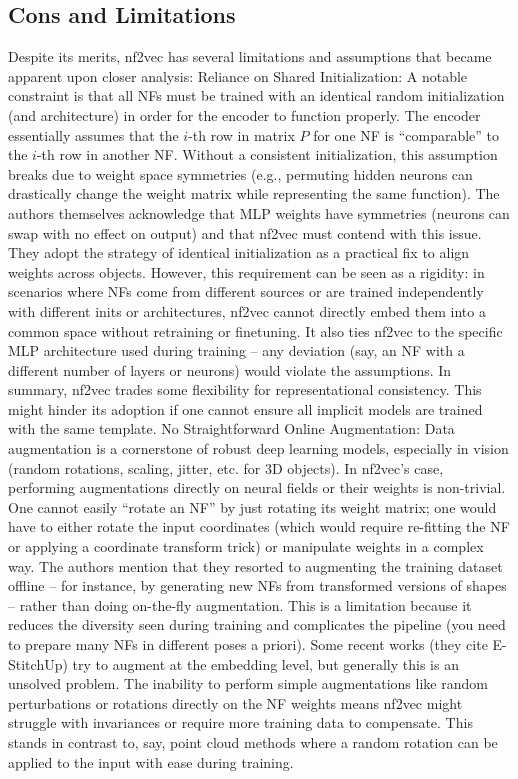 \documentclass[11pt]{article}
\begin{document}
\subsection*{Cons and Limitations}
Despite its merits, nf2vec has several limitations and assumptions that became apparent upon closer analysis:
Reliance on Shared Initialization: A notable constraint is that all NFs must be trained with an identical random initialization (and architecture) in order for the encoder to function properly. The encoder essentially assumes that the $i$-th row in matrix $P$ for one NF is “comparable” to the $i$-th row in another NF. Without a consistent initialization, this assumption breaks due to weight space symmetries (e.g., permuting hidden neurons can drastically change the weight matrix while representing the same function). The authors themselves acknowledge that MLP weights have symmetries (neurons can swap with no effect on output) and that nf2vec must contend with this issue. They adopt the strategy of identical initialization as a practical fix to align weights across objects. However, this requirement can be seen as a rigidity: in scenarios where NFs come from different sources or are trained independently with different inits or architectures, nf2vec cannot directly embed them into a common space without retraining or finetuning. It also ties nf2vec to the specific MLP architecture used during training – any deviation (say, an NF with a different number of layers or neurons) would violate the assumptions. In summary, nf2vec trades some flexibility for representational consistency. This might hinder its adoption if one cannot ensure all implicit models are trained with the same template.
No Straightforward Online Augmentation: Data augmentation is a cornerstone of robust deep learning models, especially in vision (random rotations, scaling, jitter, etc. for 3D objects). In nf2vec’s case, performing augmentations directly on neural fields or their weights is non-trivial. One cannot easily “rotate an NF” by just rotating its weight matrix; one would have to either rotate the input coordinates (which would require re-fitting the NF or applying a coordinate transform trick) or manipulate weights in a complex way. The authors mention that they resorted to augmenting the training dataset offline – for instance, by generating new NFs from transformed versions of shapes – rather than doing on-the-fly augmentation. This is a limitation because it reduces the diversity seen during training and complicates the pipeline (you need to prepare many NFs in different poses a priori). Some recent works (they cite E-StitchUp) try to augment at the embedding level, but generally this is an unsolved problem. The inability to perform simple augmentations like random perturbations or rotations directly on the NF weights means nf2vec might struggle with invariances or require more training data to compensate. This stands in contrast to, say, point cloud methods where a random rotation can be applied to the input with ease during training.
\end{document}
